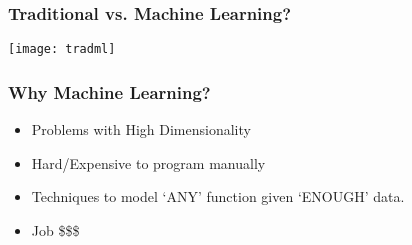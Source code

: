 


\begin{frame}[fragile]\frametitle{Traditional vs. Machine Learning?}
\begin{center}
\texttt{[image: tradml]}
\end{center}
\end{frame}

\begin{frame}[fragile]\frametitle{Why Machine Learning?}
\begin{itemize}
\item Problems with High Dimensionality
\item Hard/Expensive to program manually
\item Techniques to model `ANY' function given `ENOUGH' data.
\item Job \$\$\$
\end{itemize}
\end{frame}

